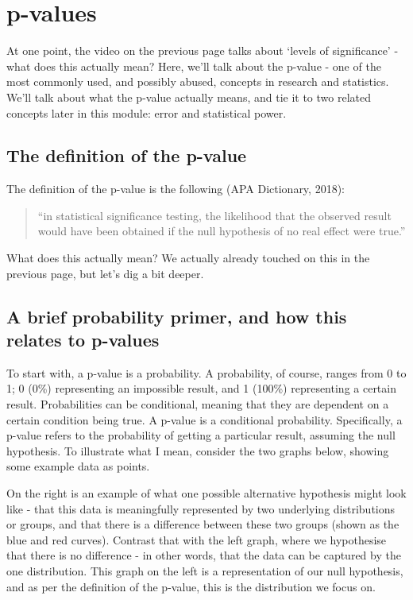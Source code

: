 \documentclass[
]{book}
\begin{document}
\section{p-values}\label{p-values}

At one point, the video on the previous page talks about `levels of significance' - what does this actually mean? Here, we'll talk about the p-value - one of the most commonly used, and possibly abused, concepts in research and statistics. We'll talk about what the p-value actually means, and tie it to two related concepts later in this module: error and statistical power.

\subsection{The definition of the p-value}\label{the-definition-of-the-p-value}

The definition of the p-value is the following (APA Dictionary, 2018):

\begin{quote}
``in statistical significance testing, the likelihood that the observed result would have been obtained if the null hypothesis of no real effect were true.''
\end{quote}

What does this actually mean? We actually already touched on this in the previous page, but let's dig a bit deeper.

\subsection{A brief probability primer, and how this relates to p-values}\label{a-brief-probability-primer-and-how-this-relates-to-p-values}

To start with, a p-value is a probability. A probability, of course, ranges from 0 to 1; 0 (0\%) representing an impossible result, and 1 (100\%) representing a certain result. Probabilities can be conditional, meaning that they are dependent on a certain condition being true. A p-value is a conditional probability. Specifically, a p-value refers to the probability of getting a particular result, assuming the null hypothesis. To illustrate what I mean, consider the two graphs below, showing some example data as points.

On the right is an example of what one possible alternative hypothesis might look like - that this data is meaningfully represented by two underlying distributions or groups, and that there is a difference between these two groups (shown as the blue and red curves). Contrast that with the left graph, where we hypothesise that there is no difference - in other words, that the data can be captured by the one distribution. This graph on the left is a representation of our null hypothesis, and as per the definition of the p-value, this is the distribution we focus on.
\end{document}
